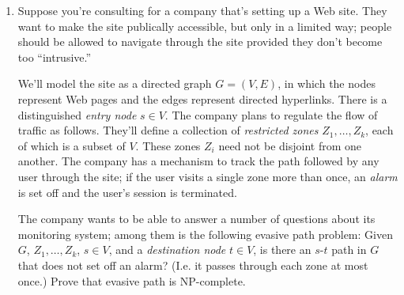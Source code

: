 \documentclass[12pt]{article}
\begin{document}
\begin{enumerate}

\item

Suppose you're consulting for a company
that's setting up a Web site.
They want to make the site publically accessible, but only
in a limited way; people should be allowed to
navigate through the site provided they don't
become too ``intrusive.''

We'll model the site as a directed graph $G = (V,E)$,
in which the nodes represent Web pages and
the edges represent directed hyperlinks.
There is a distinguished {\em entry node} $s \in V$.
The company plans to regulate the flow of traffic as follows.
They'll define a collection of {\em restricted zones}
$Z_1, \ldots, Z_k$, each of which is a subset of $V$.
These zones $Z_i$ need not be disjoint from one another.
The company has a mechanism to track the path followed by
any user through the site; if the user visits
a single zone more than once, an {\em alarm} is
set off and the user's session is terminated.

The company wants to be able to answer a number
of questions about its monitoring system;
among them is the following {\sc evasive path} problem:
Given $G$, $Z_1, \ldots, Z_k$, $s \in V$, and
a {\em destination node} $t \in V$,
is there an $s$-$t$ path in $G$ that does not
set off an alarm?  (I.e. it passes through each
zone at most once.)
Prove that {\sc evasive path} is NP-complete.

\end{enumerate}
\end{document}
